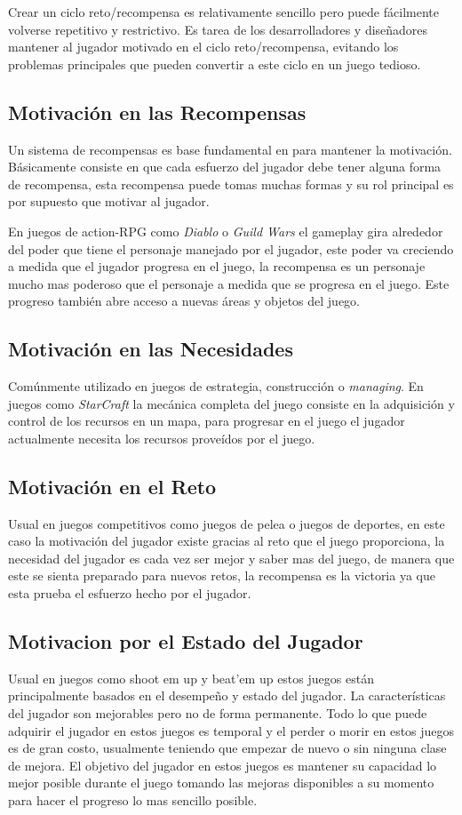 Crear un ciclo reto/recompensa es relativamente sencillo pero puede fácilmente volverse repetitivo y restrictivo. Es tarea de los desarrolladores y diseñadores mantener al jugador motivado en el ciclo reto/recompensa, evitando los problemas principales que pueden convertir a este ciclo en un juego tedioso.
\subsection{Motivación en las Recompensas}
Un sistema de recompensas es base fundamental en para mantener la motivación. Básicamente consiste en que cada esfuerzo del jugador debe tener alguna forma de recompensa, esta recompensa puede tomas muchas formas y su rol principal es por supuesto que motivar al jugador.

En juegos de action-RPG como \emph{Diablo} \cite{diablo} o \emph{Guild Wars} \cite{guildwars} el gameplay gira alrededor del poder que tiene el personaje manejado por el jugador, este poder va creciendo a medida que el jugador progresa en el juego, la recompensa es un personaje mucho mas poderoso que el personaje a medida que se progresa en el juego. Este progreso también abre acceso a nuevas áreas y objetos del juego.
\subsection{Motivación en las Necesidades}
Comúnmente utilizado en juegos de estrategia, construcción o \emph{managing}. En juegos como \emph{StarCraft} \cite{starcraft} la mecánica completa del juego consiste en la adquisición y control de los recursos en un mapa, para progresar en el juego el jugador actualmente necesita los recursos proveídos por el juego.
\subsection{Motivación en el Reto}
Usual en juegos competitivos como juegos de pelea o juegos de deportes, en este caso la motivación del jugador existe gracias al reto que el juego proporciona, la necesidad del jugador es cada vez ser mejor y saber mas del juego, de manera que este se sienta preparado para nuevos retos, la recompensa es la victoria ya que esta prueba el esfuerzo hecho por el jugador.
\subsection{Motivacion por el Estado del Jugador}
Usual en juegos como shoot em up y beat'em up estos juegos están principalmente basados en el desempeño y estado del jugador. La características del jugador son mejorables pero no de forma permanente. Todo lo que puede adquirir el jugador en estos juegos es temporal y el perder o morir en estos juegos es de gran costo, usualmente teniendo que empezar de nuevo o sin ninguna clase de mejora. El objetivo del jugador en estos juegos es mantener su capacidad lo mejor posible durante el juego tomando las mejoras disponibles a su momento para hacer el progreso lo mas sencillo posible.
